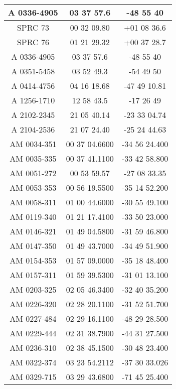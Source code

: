 \begin{apendicesenv}
\begin{longtable}{|c|c|c|}
            A 0336-4905 & 03 37 57.6 & -48 55 40 \\ \hline
            SPRC 73 & 00 32 09.80 & +01 08 36.6 \\ \hline
            SPRC 76 & 01 21 29.32 & +00 37 28.7 \\ \hline
            A 0336-4905 & 03 37 57.6 & -48 55 40 \\ \hline
            A 0351-5458 & 03 52 49.3 & -54 49 50 \\ \hline
            A 0414-4756 & 04 16 18.68 & -47 49 10.81 \\ \hline
            A 1256-1710 & 12 58 43.5 & -17 26 49 \\ \hline
            A 2102-2345 & 21 05 40.14 & -23 33 04.74 \\ \hline
            A 2104-2536 & 21 07 24.40 & -25 24 44.63 \\ \hline
            AM 0034-351 & 00 37 04.6600 & -34 56 24.400 \\ \hline
            AM 0035-335 & 00 37 41.1100 & -33 42 58.800 \\ \hline
            AM 0051-272 & 00 53 59.57 & -27 08 33.35 \\ \hline
            AM 0053-353 & 00 56 19.5500 & -35 14 52.200 \\ \hline
            AM 0058-311 & 01 00 44.6000 & -30 55 49.100 \\ \hline
            AM 0119-340 & 01 21 17.4100 & -33 50 23.000 \\ \hline
            AM 0146-321 & 01 49 04.5800 & -31 59 46.800 \\ \hline
            AM 0147-350 & 01 49 43.7000 & -34 49 51.900 \\ \hline
            AM 0154-353 & 01 57 09.0000 & -35 18 48.400 \\ \hline
            AM 0157-311 & 01 59 39.5300 & -31 01 13.100 \\ \hline
            AM 0203-325 & 02 05 46.3400 & -32 40 35.200 \\ \hline
            AM 0226-320 & 02 28 20.1100 & -31 52 51.700 \\ \hline
            AM 0227-484 & 02 29 16.1100 & -48 29 28.500 \\ \hline
            AM 0229-444 & 02 31 38.7900 & -44 31 27.500 \\ \hline
            AM 0236-310 & 02 38 45.1500 & -30 48 23.400 \\ \hline
            AM 0322-374 & 03 23 54.2112 & -37 30 33.026 \\ \hline
            AM 0329-715 & 03 29 43.6800 & -71 45 25.400 \\ \hline

\end{longtable}
\end{apendicesenv}
